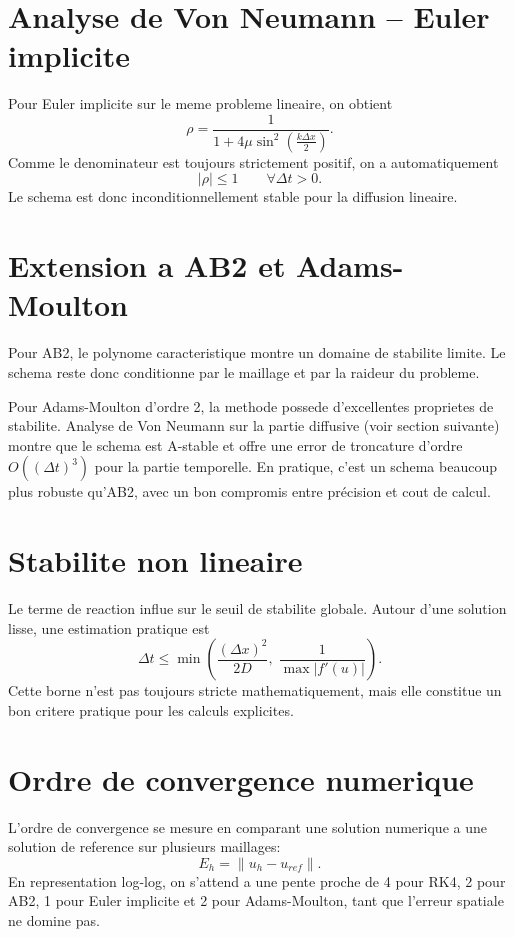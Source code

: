 \documentclass[11pt,a4paper]{report}
\begin{document}
\section{Analyse de Von Neumann -- Euler implicite}
Pour Euler implicite sur le meme probleme lineaire, on obtient
\begin{equation}
 \rho = \frac{1}{1+4\mu\sin^2\left(\frac{k\Delta x}{2}\right)}.
\end{equation}
Comme le denominateur est toujours strictement positif, on a automatiquement
\begin{equation}
 |\rho|\le 1 \qquad \forall \Delta t>0.
\end{equation}
Le schema est donc inconditionnellement stable pour la diffusion lineaire.

\section{Extension a AB2 et Adams-Moulton}
Pour AB2, le polynome caracteristique montre un domaine de stabilite limite. Le schema
reste donc conditionne par le maillage et par la raideur du probleme.

Pour Adams-Moulton d'ordre 2, la methode possede d'excellentes proprietes de stabilite.
Analyse de Von Neumann sur la partie diffusive (voir section suivante) montre que le schema
est A-stable et offre une error de troncature d'ordre $O((\Delta t)^3)$ pour la partie temporelle.
En pratique, c'est un schema beaucoup plus robuste qu'AB2, avec un bon compromis entre
précision et cout de calcul.

\section{Stabilite non lineaire}
Le terme de reaction influe sur le seuil de stabilite globale.
Autour d'une solution lisse, une estimation pratique est
\begin{equation}
 \Delta t \leq \min\left(\frac{(\Delta x)^2}{2D},\; \frac{1}{\max |f'(u)|}\right).
\end{equation}
Cette borne n'est pas toujours stricte mathematiquement, mais elle constitue un bon critere
pratique pour les calculs explicites.

\section{Ordre de convergence numerique}
L'ordre de convergence se mesure en comparant une solution numerique a une solution de
reference sur plusieurs maillages:
\begin{equation}
 E_h = \|u_h-u_{ref}\|.
\end{equation}
En representation log-log, on s'attend a une pente proche de 4 pour RK4,
2 pour AB2, 1 pour Euler implicite et 2 pour Adams-Moulton, tant que l'erreur spatiale ne domine pas.
\end{document}

